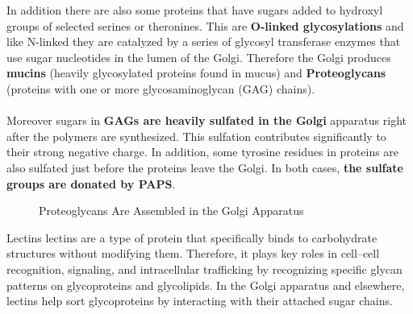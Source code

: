 \documentclass[../main.tex]{subfiles}
\begin{document}
In addition there are also some proteins that have sugars added to hydroxyl groups of selected serines or theronines. This are \textbf{O-linked glycosylations} and like N-linked they are catalyzed by a series of glycosyl transferase enzymes that use sugar nucleotides in the lumen of the Golgi. Therefore the Golgi produces \textbf{mucins} (heavily glycosylated proteins found in mucus) and \textbf{Proteoglycans} (proteins with one or more glycosaminoglycan (GAG) chains). \\
\\
Moreover sugars in \textbf{\gls{GAGs} are heavily sulfated in the Golgi} apparatus right after the polymers are synthesized. This sulfation contributes significantly to their strong negative charge. In addition, some tyrosine residues in proteins are also sulfated just before the proteins leave the Golgi. In both cases, \textbf{the sulfate groups are donated by \gls{PAPS}}.

\begin{figure}[H]
	\centering
	\caption{Proteoglycans Are Assembled in the Golgi Apparatus}
\end{figure}

\begin{DefWithTitle}{Lectins}
		\gls{lectin}s are a type of protein that specifically binds to carbohydrate structures without modifying them. Therefore, it plays key roles in cell–cell recognition, signaling, and intracellular trafficking by recognizing specific glycan patterns on glycoproteins and glycolipids. In the Golgi apparatus and elsewhere, lectins help sort glycoproteins by interacting with their attached sugar chains. 
\end{DefWithTitle}
\end{document}
